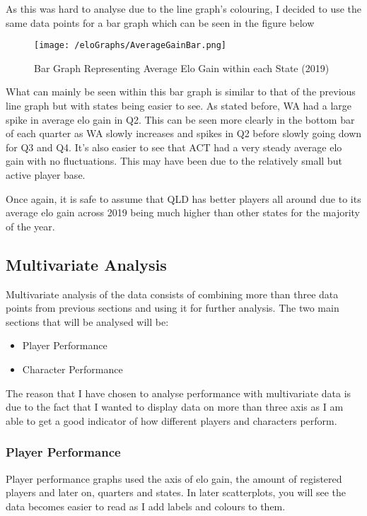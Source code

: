 \documentclass[11pt, oneside, a4paper]{article}
\begin{document}
As this was hard to analyse due to the line graph's colouring, I decided to use the same data points for a bar graph which can be seen in the figure below

\newpage
\begin{figure}[!ht]
	\centerline{\texttt{[image: /eloGraphs/AverageGainBar.png]}}
	\caption{Bar Graph Representing Average Elo Gain within each State  (2019)}
	\label{fig:figure2}
\end{figure}

What can mainly be seen within this bar graph is similar to that of the previous line graph but with states being easier to see. As stated before, WA had a large spike in average elo gain in Q2. This can be seen more clearly in the bottom bar of each quarter as WA slowly increases and spikes in Q2 before slowly going down for Q3 and Q4. It's also easier to see that ACT had a very steady average elo gain with no fluctuations. This may have been due to the relatively small but active player base. 

Once again, it is safe to assume that QLD has better players all around due to its average elo gain across 2019 being much higher than other states for the majority of the year.

\newpage
\subsection{Multivariate Analysis}
Multivariate analysis of the data consists of combining more than three data points from previous sections and using it for further analysis. The two main sections that will be analysed will be:

\begin{itemize}
	\item Player Performance
	\item Character Performance
\end{itemize}

The reason that I have chosen to analyse performance with multivariate data is due to the fact that I wanted to display data on more than three axis as I am able to get a good indicator of how different players and characters perform.

\subsubsection{Player Performance}
Player performance graphs used the axis of elo gain, the amount of registered players and later on, quarters and states. In later scatterplots, you will see the data becomes easier to read as I add labels and colours to them.
\end{document}
